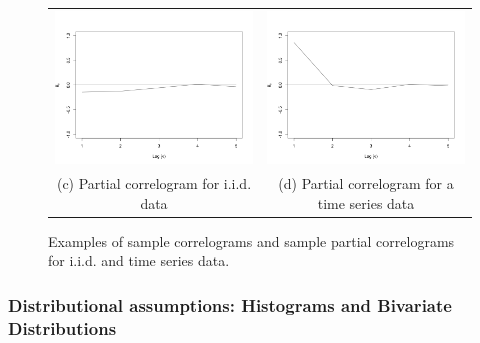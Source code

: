 \begin{figure}
\begin{center}
\begin{tabular}{cc}
\includegraphics[scale=0.25]{./figures/PartialCorrelogramGaussian} &
\includegraphics[scale=0.25]{./figures/PartialCorrelogramTimeSerie} \\
(c) Partial correlogram for i.i.d. data & (d) Partial correlogram for a time series data \\
\end{tabular}
\caption{\label{Figure:PreliminariesCorrelograms} Examples of sample correlograms and sample partial correlograms for i.i.d. and time series data. 
}
\end{center}
\end{figure}

\subsubsection{Distributional assumptions: Histograms and Bivariate Distributions}

